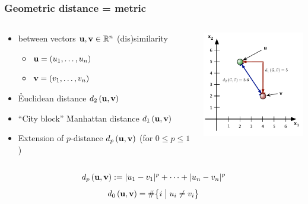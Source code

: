 \documentclass[t]{beamer} %
\begin{document}
\begin{frame}
  \frametitle{Geometric distance = metric}

  \begin{columns}[T]
    \begin{column}{60mm}
      \begin{itemize}
      \item {} between vectors $\vu, \vv \in \setR^n$ \so
        (dis)similarity
        \begin{itemize}
        \item $\vu = (u_1, \ldots, u_n)$
        \item $\vv = (v_1, \ldots, v_n)$
        \end{itemize}
      \item \h{Euclidean} distance $\dist[2]{\vu}{\vv}$
      \item ``City block'' \h{Manhattan} distance $\dist[1]{\vu}{\vv}$
      \item Extension of $p$-distance  $\dist[p]{\vu}{\vv}$ (for $0\leq p\leq 1$)
      \end{itemize}
    \end{column}
    \begin{column}{45mm}
      \includegraphics[width=45mm]{img/7_distance_examples}
    \end{column}
  \end{columns}
  \gap[.5]
  \[ \dist[p]{\vu}{\vv} \coloneq \abs{u_1 - v_1}^p + \dots + \abs{u_n - v_n}^p \]
  \[ \dist[0]{\vu}{\vv} = \# \bigsetdef{i}{u_i \neq v_i} \]
\end{frame}
\end{document}
